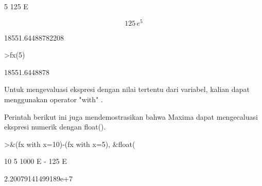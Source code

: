 \documentclass{article}
\begin{document}
\begin{eulernotebook}
\begin{euleroutput}
                                       5
                                  125 E
  
\end{euleroutput}
\begin{eulerformula}
\[
125\,e^5
\]
\end{eulerformula}
\begin{euleroutput}
  
                            18551.64488782208
  
\end{euleroutput}
\begin{eulerprompt}
>fx(5)
\end{eulerprompt}
\begin{euleroutput}
  18551.6448878
\end{euleroutput}
\begin{eulercomment}
Untuk mengevaluasi ekspresi dengan nilai tertentu dari variabel,
kalian dapat menggunakan operator "with" .

Perintah berikut ini juga mendemostrasikan bahwa Maxima dapat
mengecaluasi ekspresi numerik dengan float().
\end{eulercomment}
\begin{eulerprompt}
>&(fx with x=10)-(fx with x=5), &float(%
\end{eulerprompt}
\begin{euleroutput}
  
                                  10        5
                            1000 E   - 125 E
  
  
                           2.20079141499189e+7
  

\end{euleroutput}
\end{eulernotebook}
\end{document}
